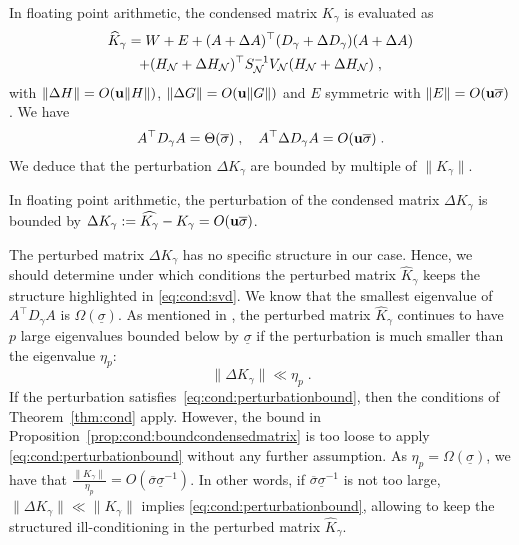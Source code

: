 In floating point arithmetic, the condensed matrix $K_\gamma$ is evaluated as
\begin{multline*}
  \widehat{K}_\gamma = W + E + (A + \Delta A)^\top (D_\gamma + \Delta D_\gamma) (A + \Delta A) \\
  + (H_{\mathcal{N}} + \Delta H_{\mathcal{N}})^\top S_{\mathcal{N}}^{-1} V_{\mathcal{N}} (H_{\mathcal{N}} + \Delta H_{\mathcal{N}}) \; ,
\end{multline*}
with $\| \Delta H \| = O(\mathbf{u} \| H\|)$, $\| \Delta G \| = O(\mathbf{u} \| G\|)$
and $E$ symmetric with $\|E \| = O(\mathbf{u} \overline{\sigma})$.
We have
\begin{equation}
A^\top D_\gamma A = \Theta(\overline{\sigma}) \; , \quad
A^\top \Delta D_\gamma A = O(\mathbf{u} \overline{\sigma}) \; .
\end{equation}
We deduce that the perturbation $\Delta K_\gamma$ are bounded
by multiple of $\| K_\gamma \|$.
\begin{proposition}
  \label{prop:cond:boundcondensedmatrix}
  In floating point arithmetic, the perturbation
  of the condensed matrix $\Delta K_\gamma$ is bounded by
  $\Delta K_\gamma := \widehat{K_\gamma} - K_\gamma  = O(\mathbf{u} \overline{\sigma})$.
\end{proposition}
The perturbed matrix $\Delta K_\gamma$ has no specific structure
in our case. Hence, we should determine under which
conditions the perturbed matrix $\widehat{K}_\gamma$
keeps the structure highlighted in \eqref{eq:cond:svd}.
We know that the smallest eigenvalue of $A^\top D_\gamma A$
is $\Omega(\underline{\sigma})$. As mentioned in
\cite[Section 3.4.2]{wright1998ill}, the perturbed matrix
$\widehat{K}_\gamma$ continues to have $p$ large eigenvalues
bounded below by $\underline{\sigma}$ if the perturbation
is much smaller than the eigenvalue $\eta_p$:
\begin{equation}
  \label{eq:cond:perturbationbound}
  \| \Delta K_\gamma \| \ll \eta_p  \; .
\end{equation}
If the perturbation satisfies~\eqref{eq:cond:perturbationbound}, then
the conditions of Theorem~\ref{thm:cond} apply. However,
the bound in Proposition~\ref{prop:cond:boundcondensedmatrix} is too loose
to apply \eqref{eq:cond:perturbationbound} without any further assumption.
As $\eta_p = \Omega(\underline{\sigma})$, we have that $\frac{\|K_\gamma \|}{\eta_p}
= O(\overline{\sigma}\underline{\sigma}^{-1})$. In other words,
if $\overline{\sigma}\underline{\sigma}^{-1}$ is not too large,
$\|\Delta K_\gamma\| \ll \| K_\gamma \|$ implies \eqref{eq:cond:perturbationbound},
allowing to keep the structured ill-conditioning in the perturbed
matrix $\widehat{K}_\gamma$.

